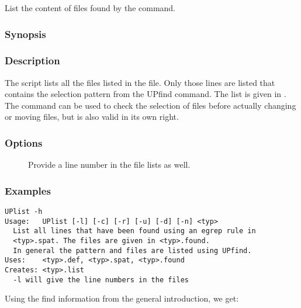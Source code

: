 List the content of files found by the  command.

\subsubsection*{Synopsis}

\begin{synopsis}
\end{synopsis}

\subsubsection*{Description}

\noindent
The  script lists all the files listed in the 
file. Only those lines are listed that contains the selection pattern from
the UPfind command. The list is given in . The command can
be used to check the selection of files before actually changing or moving
files, but is also valid in its own right.

\subsubsection*{Options}

\begin{description}
\item[]
    Provide a line number in the file lists as well.
\end{description}

\subsubsection*{Examples}

\begin{verbatim}
UPlist -h
Usage:   UPlist [-l] [-c] [-r] [-u] [-d] [-n] <typ>
  List all lines that have been found using an egrep rule in
  <typ>.spat. The files are given in <typ>.found.
  In general the pattern and files are listed using UPfind.
Uses:    <typ>.def, <typ>.spat, <typ>.found
Creates: <typ>.list
  -l will give the line numbers in the files
\end{verbatim}

\noindent
Using the find information from the general introduction, we get:

